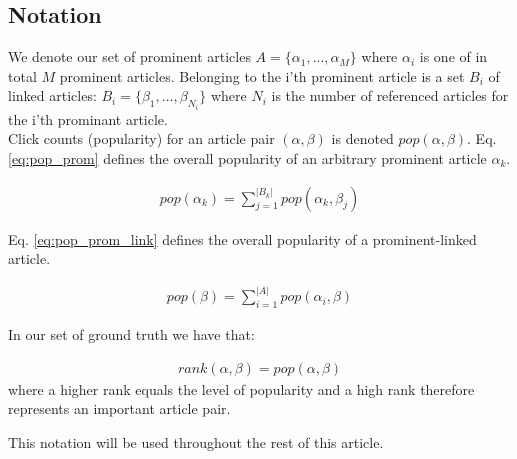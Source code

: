 \subsection{Notation}

We denote our set of prominent articles $A = \{ \alpha_1, ..., \alpha_M \}$ where $\alpha_i$ is one of in total $M$ prominent articles. Belonging to the i'th prominent article is a set $B_i$ of linked articles: $B_i = \{ \beta_1, ..., \beta_{N_i} \}$ where $N_i$ is the number of referenced articles for the i'th prominant article. \\

Click counts (popularity) for an article pair $(\alpha, \beta)$ is denoted $pop(\alpha, \beta)$. Eq. \ref{eq:pop_prom} defines the overall popularity of an arbitrary prominent article $\alpha_k$.

\begin{align}
pop(\alpha_k) = \sum\limits_{j=1}^{|B_k|} pop(\alpha_k, \beta_j)
\label{eq:pop_prom}
\end{align}

Eq. \ref{eq:pop_prom_link} defines the overall popularity of a prominent-linked article.

\begin{align}
pop(\beta) = \sum\limits_{i=1}^{|A|} pop(\alpha_i, \beta)
\label{eq:pop_prom_link}
\end{align}

In our set of ground truth we have that:

\begin{align}
rank(\alpha, \beta) = pop(\alpha, \beta)
\label{eq:pop_rank_relation_for_gt}
\end{align}
where a higher rank equals the level of popularity and a high rank therefore represents an important article pair.

This notation will be used throughout the rest of this article.

 \\